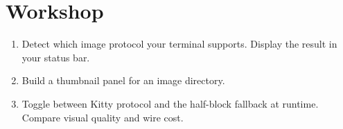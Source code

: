 \section*{Workshop}

\begin{enumerate}[leftmargin=*]
  \item Detect which image protocol your terminal supports.
    Display the result in your status bar.
  \item Build a thumbnail panel for an image directory.
  \item Toggle between Kitty protocol and the half-block
    fallback at runtime. Compare visual quality and wire
    cost.
\end{enumerate}
